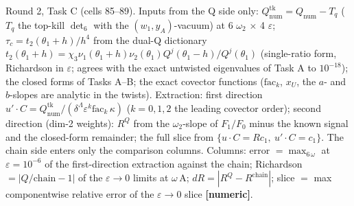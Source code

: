 \documentclass[10pt]{article}
\begin{document}
Round 2, Task C (cells 85--89). Inputs from the Q side only: $Q_{\mathrm{num}}^{\mathrm{tk}}=Q_{\mathrm{num}}-T_q$ ($T_q$ the top-kill $\det_6$ with the $(w_1,y_A)$-vacuum) at 6 $\omega_2$ $\times$ 4 $\varepsilon$; $\tau_c=t_2(\theta_1+h)/h^4$ from the dual-Q dictionary $t_2(\theta_1+h)=\chi_3\nu_1(\theta_1+h)\nu_2(\theta_1)Q^j(\theta_1-h)/Q^j(\theta_1)$ (single-ratio form, Richardson in $\varepsilon$; agrees with the exact untwisted eigenvalues of Task A to $10^{-18}$); the closed forms of Tasks A--B; the exact covector functions ($\mathrm{fac}_k$, $x_U$, the $a$- and $b$-slopes are analytic in the twists). Extraction: first direction $u'\cdot C=Q^{\mathrm{tk}}_{\mathrm{num}}/(\delta^\Lambda\varepsilon^k\mathrm{fac}_k\,\kappa)$ ($k=0,1,2$ the leading covector order); second direction (dim-2 weights): $R^Q$ from the $\omega_2$-slope of $F_1/F_0$ minus the known signal and the closed-form remainder; the full slice from $\{u\cdot C=Rc_1,\ u'\cdot C=c_1\}$. The chain side enters only the comparison columns. Columns: error $=\max_{6\,\omega}$ at $\varepsilon=10^{-6}$ of the first-direction extraction against the chain; Richardson $=|Q/\mathrm{chain}-1|$ of the $\varepsilon\to0$ limits at $\omega\,\mathrm{A}$; $dR=|R^Q-R^{\mathrm{chain}}|$; slice $=$ max componentwise relative error of the $\varepsilon\to0$ slice \textbf{[numeric]}.
\end{document}
